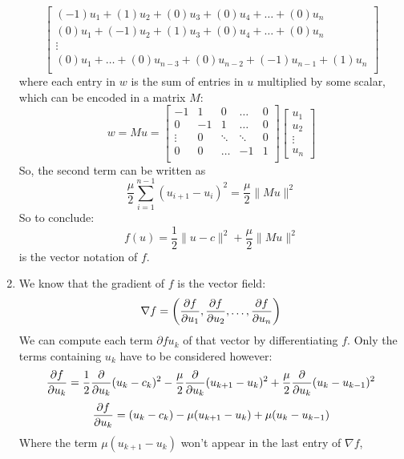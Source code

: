 \documentclass[12pt]{article}
\begin{document}
\begin{enumerate}[label=\alph*)]
\[\begin{bmatrix}
            (-1)u_1 + (1)u_2 + (0)u_3 + (0)u_4 
            + \dots + (0)u_n \\
            (0)u_1 + (-1)u_2 + (1)u_3 + (0)u_4 
            + \dots + (0)u_n \\
            \vdots \\
            (0)u_1 + \dots + (0)u_{n-3} + (0)u_{n-2} 
            + (-1)u_{n-1} + (1)u_n \\
        \end{bmatrix} \]
        where each entry in $w$ is the sum
        of entries in $u$ multiplied by some scalar,
        which can be encoded in a matrix $M$:
        \[ w = Mu =
        \begin{bmatrix}
            -1 & 1 & 0 & \dots & 0 \\
            0 & -1 & 1 & \dots & 0 \\
            \vdots & 0 & \ddots & \ddots & 0\\
            0 & 0 & \dots & -1 & 1 \\
        \end{bmatrix}
        \begin{bmatrix}
           u_1 \\ u_2 \\ \vdots \\ u_n
        \end{bmatrix} \]
        So, the second term can be written as
         \[ \dfrac{\mu}{2}
        \sum_{i=1}^{n-1}(u_{i+1} - u_i)^2
         = \dfrac{\mu}{2}\| Mu \|^2 \]
        So to conclude:
        \[ f(u) = \dfrac{1}{2}\| u - c \|^2
        + \dfrac{\mu}{2}\| Mu \|^2  \]
        is the vector notation of $f$. \\
        \item
        We know that the gradient of $f$ is 
        the vector field:
        \[ \nabla f = \left( \dfrac{\partial f}{\partial u_1},
        \dfrac{\partial f}{\partial u_2}, \dots, \dfrac{\partial f}{\partial u_n} \right) \]
        We can compute each term $\partial{f}{u_k}$
        of that vector by differentiating $f$.
        Only the terms containing $u_k$
        have to be considered however:
        \[ 
            \dfrac{\partial f}{\partial u_k}
            = \dfrac{1}{2}\dfrac{\partial }{\partial u_k}
            (u_k - c_k)^2
            - \dfrac{\mu}{2}\dfrac{\partial }{\partial u_k}
            (u_{k+1} - u_k)^2
            + \dfrac{\mu}{2}\dfrac{\partial }{\partial u_k}
            (u_{k} - u_{k-1})^2
        \]
        \[ \dfrac{\partial f}{\partial u_k} = (u_k - c_k)
        - \mu(u_{k+1} - u_k) + \mu(u_{k} - u_{k-1}) \]
        Where the term $\mu(u_{k+1} - u_k)$
        won't appear in the last entry of $\nabla f$,

\end{enumerate}
\end{document}
